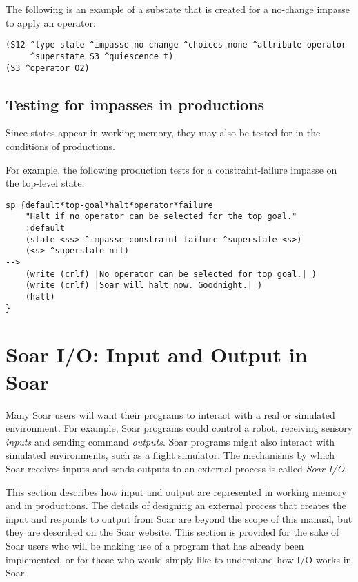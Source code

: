 The following is an example of a substate that is created for a no-change
impasse to apply an operator:
\begin{verbatim}
(S12 ^type state ^impasse no-change ^choices none ^attribute operator 
     ^superstate S3 ^quiescence t)
(S3 ^operator O2)
\end{verbatim} \vspace{12pt}

\subsection{Testing for impasses in productions}

Since states appear in working memory, they may also be
tested for in the conditions of productions.


For example, the following production tests for a constraint-failure impasse
on the top-level state.

\begin{verbatim}
sp {default*top-goal*halt*operator*failure
    "Halt if no operator can be selected for the top goal."
    :default
    (state <ss> ^impasse constraint-failure ^superstate <s>)
    (<s> ^superstate nil)
-->
    (write (crlf) |No operator can be selected for top goal.| )
    (write (crlf) |Soar will halt now. Goodnight.| )
    (halt)
}
\end{verbatim}

\section{Soar I/O: Input and Output in Soar}
\label{SYNTAX-io}

Many Soar users will want their programs to interact with a real or simulated
environment. For example, Soar programs could control a robot, receiving sensory
\emph{inputs} and sending command \textit{outputs}. Soar programs might 
also interact with
simulated environments, such as a flight simulator. The mechanisms by which
Soar receives inputs and sends outputs to an external process is called
\emph{Soar I/O}.

This section describes how input and output are represented in working memory
and in productions.  The details of designing an external process that creates the input and 
responds to output from Soar are beyond the scope of this manual, but they are
described  
on the Soar website. This section is provided for the sake of Soar users who will be making
use of a program that has already been implemented, or for those who would
simply like to understand how I/O works in Soar.


